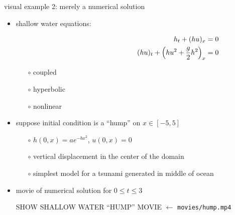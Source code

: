 \documentclass[10pt,dvipsnames,usepdftitle=false,
hyperref={pdftitle = {Finite volume methods},
    pdfauthor = {Ed Bueler}}]{beamer}
\begin{document}
\begin{frame}{visual example 2: merely a numerical solution}

\begin{itemize}
\item shallow water equations:

\vspace{-11.5mm}
\begin{align*}
\hspace{60mm} h_t + (hu)_x &= 0 \\
(hu)_t + \left(h u^2 + \frac{g}{2} h^2\right)_x &= 0
\end{align*}

\vspace{-5mm}
    \begin{itemize}
    \item[$\circ$] coupled
    \item[$\circ$] hyperbolic
    \item[$\circ$] nonlinear
    \end{itemize}
\item suppose initial condition is a ``hump'' on $x \in [-5,5]$
    \begin{itemize}
    \item[$\circ$] $h(0,x)=a e^{-bx^2}$, $u(0,x)=0$
    \item[$\circ$] vertical displacement in the center of the domain
    \item[$\circ$] simplest model for a tsunami generated in middle of ocean
    \end{itemize}
\item movie of numerical solution for $0 \le t \le 3$

\vspace{10mm}
\begin{center}
\alert{SHOW SHALLOW WATER ``HUMP'' MOVIE}  \qquad $\leftarrow$ \texttt{movies/hump.mp4}
\end{center}

\vspace{10mm}

\end{itemize}
\end{frame}
\end{document}
